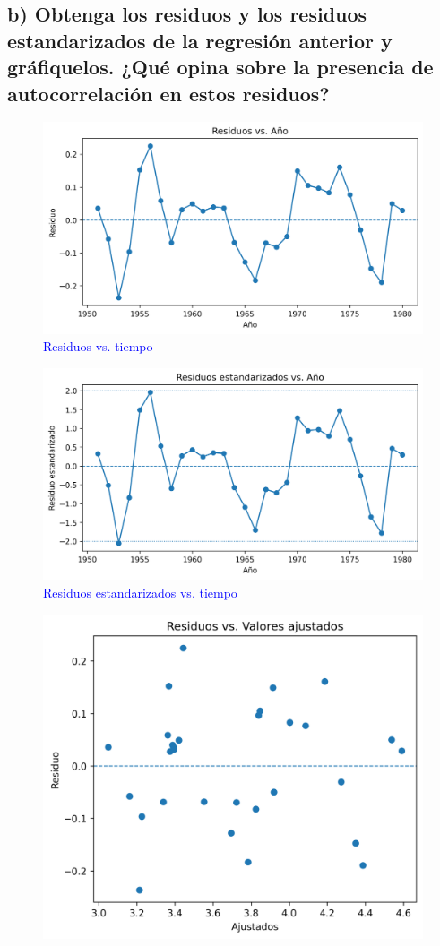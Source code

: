 \documentclass[10pt]{article}
\begin{document}
    \subsection{b) Obtenga los residuos y los residuos estandarizados de la regresión anterior y gráfiquelos. ¿Qué opina sobre la presencia de autocorrelación en estos residuos?}
    \textcolor{blue}{
    \begin{figure}[H]
        \centering
        \includegraphics[width=0.9\linewidth]{../plots/python/ex7/ex7_residuos_vs_time.png}
        \caption{Residuos vs. tiempo}
    \end{figure}
    \begin{figure}[H]
        \centering
        \includegraphics[width=0.9\linewidth]{../plots/python/ex7/ex7_stdres_vs_time.png}
        \caption{Residuos estandarizados vs. tiempo}
    \end{figure}
    \begin{figure}[H]
        \centering
        \includegraphics[width=0.55\linewidth]{../plots/python/ex7/ex7_residuos_vs_fitted.png}

\end{figure}}
\end{document}
